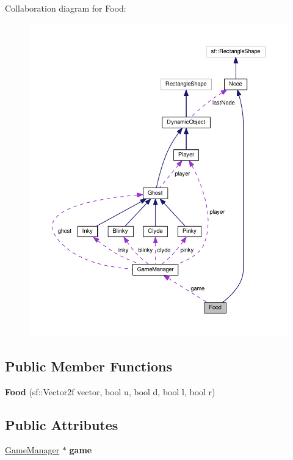 Collaboration diagram for Food\+:\nopagebreak
\begin{figure}[H]
\begin{center}
\leavevmode
\includegraphics[width=350pt]{classFood__coll__graph}
\end{center}
\end{figure}
\subsection*{Public Member Functions}
\begin{DoxyCompactItemize}
\item 
\mbox{\label{classFood_aae0f694b088560c8d826c60911ab2b16}} 
{\bfseries Food} (sf\+::\+Vector2f vector, bool u, bool d, bool l, bool r)
\end{DoxyCompactItemize}
\subsection*{Public Attributes}
\begin{DoxyCompactItemize}
\item 
\mbox{\label{classFood_a2856658914904d30e7276d8a6e382c52}} 
\hyperlink{classGameManager}{Game\+Manager} $\ast$ {\bfseries game}
\end{DoxyCompactItemize}
